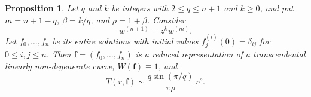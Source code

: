 \documentclass[11pt,letterpaper,reqno]{amsart}
\newtheorem{prop}[thm]{Proposition}
\theoremstyle{remark}
\numberwithin{equation}{section}
\newcommand{\fv}{\bm f}
\begin{document}
\begin{prop}\label{prop:sharpness-orders}
Let $q$ and $k$ be integers with $2\leq q\leq n+1$ and $k\geq0$, and put
$m=n+1-q$, $\beta=k/q$, and $\rho=1+\beta$. Consider
\begin{equation}\label{eq:sharpness-equation}
 w^{(n+1)}=z^k w^{(m)}.
\end{equation}
Let $f_0,\ldots,f_n$ be its entire solutions with initial values
$f_j^{(i)}(0)=\delta_{ij}$ for $0\leq i,j\leq n$.
Then $\fv=(f_0,\ldots,f_n)$ is a reduced representation of a
transcendental linearly non-degenerate curve, $W(\fv)\equiv1$, and
\begin{equation}\label{eq:sharpness-asymptotic}
 T(r,\fv)\sim\frac{q\sin(\pi/q)}{\pi\rho}\,r^\rho.
\end{equation}
\end{prop}
\end{document}
